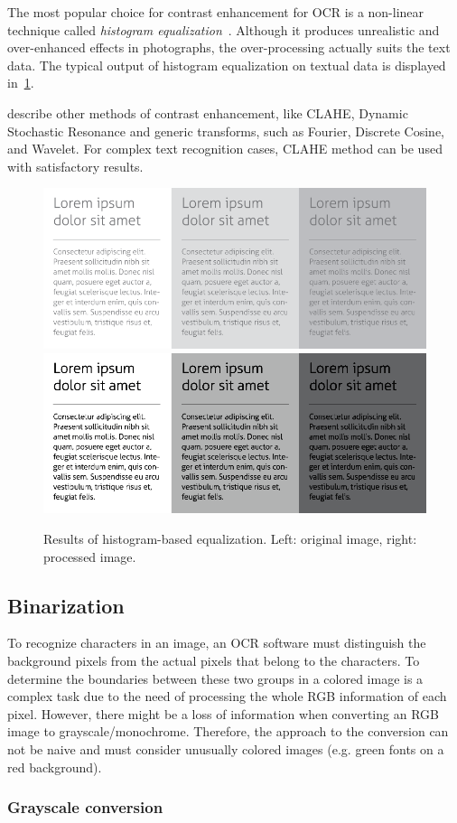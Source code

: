 The most popular choice for contrast enhancement for OCR is a non-linear technique called \emph{histogram equalization}~\citep{histogramEQ}. Although it produces unrealistic and over-enhanced effects in photographs, the over-processing actually suits the text data. The typical output of histogram equalization on textual data is displayed in~\cref{fig:preprocessHistogramEqualization}.

\citet{contrastOther} describe other methods of contrast enhancement, like CLAHE, Dynamic Stochastic Resonance and generic transforms, such as Fourier, Discrete Cosine, and Wavelet. For complex text recognition cases, CLAHE method can be used with satisfactory results.

\begin{figure}[t]
\centering
\includegraphics[width=0.4\linewidth]{img/preprocessing/contrast_low.png}
\qquad
\includegraphics[width=0.4\linewidth]{img/preprocessing/contrast_high.png}
\caption{Results of histogram-based equalization. Left: original image, right: processed image.}
\label{fig:preprocessHistogramEqualization}
\end{figure}

\subsection{Binarization} \label{binarization}

To recognize characters in an image, an OCR software must distinguish the background pixels from the actual pixels that belong to the characters. To determine the boundaries between these two groups in a colored image is a complex task due to the need of processing the whole RGB information of each pixel. However, there might be a loss of information when converting an RGB image to grayscale/monochrome. Therefore, the approach to the conversion can not be naive and must consider unusually colored images (e.g. green fonts on a red background).

\subsubsection{Grayscale conversion} \label{grayscaleConversion}

